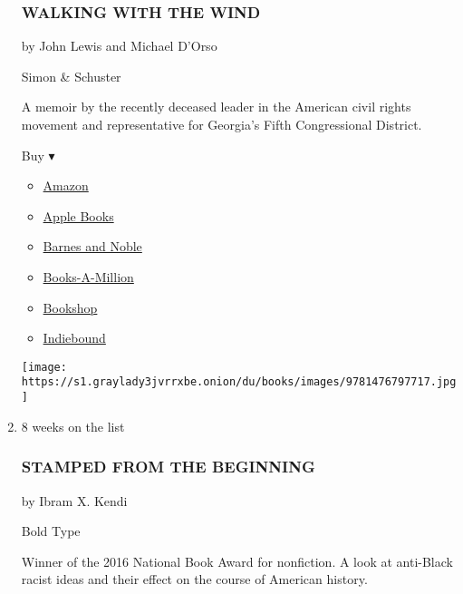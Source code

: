 \begin{enumerate}
  \hypertarget{walking-with-the-wind}{%
  \subsubsection{WALKING WITH THE WIND}\label{walking-with-the-wind}}

  by John Lewis and Michael D'Orso

  Simon \& Schuster

  A memoir by the recently deceased leader in the American civil rights
  movement and representative for Georgia's Fifth Congressional
  District.

  Buy ▾

  \begin{itemize}
  \tightlist
  \item
    \href{https://www.amazon.com/dp/1476797714?tag=NYTBSREV-20\&tag=NYTBS-20}{Amazon}
  \item
    \href{https://du-gae-books-dot-nyt-du-prd.appspot.com/buy?title=WALKING+WITH+THE+WIND\&author=John+Lewis+and+Michael+D\%27Orso}{Apple
    Books}
  \item
    \href{https://www.anrdoezrs.net/click-7990613-11819508?url=https\%3A\%2F\%2Fwww.barnesandnoble.com\%2Fw\%2F\%3Fean\%3D9781476797717}{Barnes
    and Noble}
  \item
    \href{https://www.anrdoezrs.net/click-7990613-35140?url=https\%3A\%2F\%2Fwww.booksamillion.com\%2Fp\%2FWALKING\%2BWITH\%2BTHE\%2BWIND\%2FJohn\%2BLewis\%2Band\%2BMichael\%2BD\%2527Orso\%2F9781476797717}{Books-A-Million}
  \item
    \href{https://bookshop.org/a/3546/9781476797717}{Bookshop}
  \item
    \href{https://www.indiebound.org/book/9781476797717?aff=NYT}{Indiebound}
  \end{itemize}

  \texttt{[image: https://s1.graylady3jvrrxbe.onion/du/books/images/9781476797717.jpg]}
\item
  8 weeks on the list

  \hypertarget{stamped-from-the-beginning}{%
  \subsubsection{STAMPED FROM THE
  BEGINNING}\label{stamped-from-the-beginning}}

  by Ibram X. Kendi

  Bold Type

  Winner of the 2016 National Book Award for nonfiction. A look at
  anti-Black racist ideas and their effect on the course of American
  history.


\end{enumerate}
